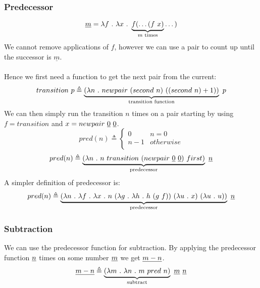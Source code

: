 \documentclass{report}
\begin{document}
\subsubsection*{Predecessor}
\[\underline{m} =  \lambda f \ . \ \lambda x \ . \ \underbrace{f(\dots (f \ x)}_\text{$m$ times} \dots )\]
We cannot remove applications of $f$, however we can use a pair to count up until the successor is $\underline{m}$.
\\
\\ Hence we first need a function to get the next pair from the current:
\[transition \ p \triangleq \underbrace{(\lambda n \ . \ newpair \ (second \ n) \ ((second \ n) + 1))}_\text{transition function} \ p\]
We can then simply run the transition $n$ times on a pair starting by using $f = transition$ and $x = newpair \ \underline{0} \ \underline{0}$.
\[pred(n) \triangleq \begin{cases}
		0     & n = 0     \\
		n - 1 & otherwise \\
	\end{cases}\]
\[pred(n) \triangleq \underbrace{(\lambda n \ . \ n \ transition \ (newpair \ \underline{0} \ \underline{0}) \ first)}_\text{predecessor} \ \underline{n}\]
A simpler definition of predecessor is:
\[pred(n) \triangleq \underbrace{(\lambda n \ . \ \lambda f \ . \ \lambda x \ . \ n \ (\lambda g \ . \ \lambda h \ . \ h \ (g \ f)) \ (\lambda u \ . \ x) \ (\lambda u \ . \ u))}_\text{predecessor} \ \underline{n}\]

\subsubsection*{Subtraction}
We can use the predecessor function for subtraction. By applying the predecessor function $\underline{n}$ times on some number $\underline{m}$ we get $\underline{m - n}$.
\[\underline{m - n} \triangleq \underbrace{(\lambda m \ . \ \lambda n \ . \ m \ pred \ n)}_\text{subtract} \ \underline{m} \ \underline{n}\]
\end{document}
